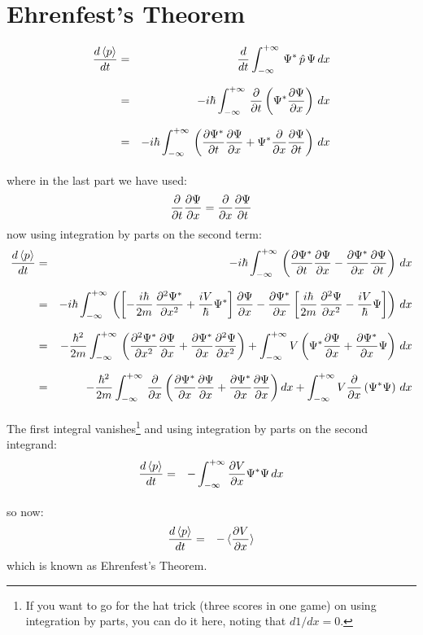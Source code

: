 \documentclass[12pt]{book}
\begin{document}
\section{Ehrenfest's Theorem}
\begin{eqnarray*}
\frac{d \braket{p}}{dt} &=& \frac{d}{dt} \int_{-\infty}^{+\infty} \, \Psi^* \, \hat{p} \, \Psi \,dx \\[7pt]
&=& -i \hbar \int_{-\infty}^{+\infty} \, \frac{\partial}{\partial t} \left(\Psi^*  \frac{\partial \Psi}{\partial x} \right) \,dx \\[7pt]
&=& -i \hbar \int_{-\infty}^{+\infty} \, \left(  \frac{\partial \Psi^*}{\partial t}   \frac{\partial \Psi}{\partial x}  + 
\Psi^* \frac{\partial}{\partial x}  \frac{\partial \Psi}{\partial t}  \right) \,dx \\[7pt]
\end{eqnarray*}
where in the last part we have used:
$$\frac{\partial}{\partial t}  \frac{\partial \Psi}{\partial x}  = \frac{\partial}{\partial x}  \frac{\partial \Psi}{\partial t} $$
now using integration by parts on the second term:
\begin{eqnarray*}
\frac{d \braket{p}}{dt} &=& -i \hbar \int_{-\infty}^{+\infty} \, 
\left(  \frac{\partial \Psi^*}{\partial t}   \frac{\partial \Psi}{\partial x}  -  \frac{\partial \Psi^*}{\partial x}   \frac{\partial \Psi}{\partial t}  \right) \,dx \\[7pt]
&=& -i \hbar \int_{-\infty}^{+\infty} \, 
\left( \left[ -\frac{i \hbar}{2 m}\, \frac{\partial^2 \Psi^*}{\partial x^2}  + \frac{i V}{\hbar} \Psi^* \right]  \frac{\partial \Psi}{\partial x}  
-  \frac{\partial \Psi^*}{\partial x}  \left[ \frac{i \hbar}{2 m}\, \frac{\partial^2 \Psi}{\partial x^2}  - \frac{i V}{\hbar} \Psi \right] \right) \,dx \\[7pt]
&=& -\frac{\hbar^2}{2 m} \int_{-\infty}^{+\infty} \, \left( \frac{\partial^2 \Psi^*}{\partial x^2}   \frac{\partial \Psi}{\partial x}  +  \frac{\partial \Psi^*}{\partial x}   \frac{\partial^2 \Psi}{\partial x^2} \right)
+ \int_{-\infty}^{+\infty} V \left( \Psi^*  \frac{\partial \Psi}{\partial x}  +  \frac{\partial \Psi^*}{\partial x}  \Psi \right) \, dx \\[7pt]
&=& -\frac{\hbar^2}{2 m} \int_{-\infty}^{+\infty} \, \frac{\partial}{\partial x} \left( \frac{\partial \Psi^*}{\partial x}   \frac{\partial \Psi}{\partial x}  +  \frac{\partial \Psi^*}{\partial x}   \frac{\partial \Psi}{\partial x} \right) dx
+ \int_{-\infty}^{+\infty} V \frac{\partial}{\partial x} \left( \Psi^* \Psi \right) \, dx \\[7pt]
\end{eqnarray*}
The first integral vanishes\footnote{If you want to go for the hat trick (three scores in one game) on using integration by parts, you can do it here, noting that $d1/dx = 0$.} and using integration by parts on the second integrand:
\begin{eqnarray*}
\frac{d \braket{p}}{dt} &=& -\int_{-\infty}^{+\infty} \frac{\partial V}{\partial x} \Psi^* \Psi \, dx \\[7pt]
\end{eqnarray*}
so now:
\begin{eqnarray}
\label{eqn:ehrenfest}
\frac{d \braket{p}}{dt} &=& - \braket{\frac{\partial V}{\partial x}}
\end{eqnarray}
which is known as Ehrenfest's Theorem.
\end{document}
